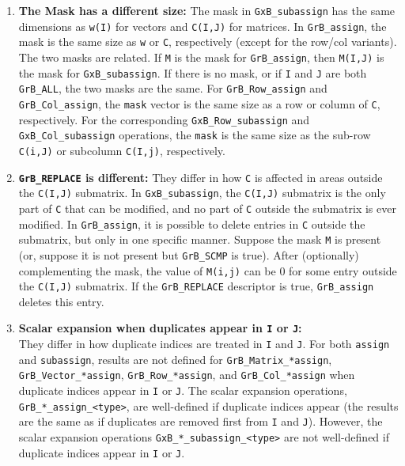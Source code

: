 \documentclass[12pt]{article}
\begin{document}
\begin{enumerate}
\item {\bf The Mask has a different size:}
    The mask in \verb'GxB_subassign' has the same dimensions as \verb'w(I)' for
    vectors and \verb'C(I,J)' for matrices.  In \verb'GrB_assign', the mask is
    the same size as \verb'w' or \verb'C', respectively (except for the row/col
    variants).  The two masks are related.  If \verb'M' is the mask for
    \verb'GrB_assign', then \verb'M(I,J)' is the mask for \verb'GxB_subassign'.
    If there is no mask, or if \verb'I' and \verb'J' are both \verb'GrB_ALL',
    the two masks are the same.
    For \verb'GrB_Row_assign' and \verb'GrB_Col_assign', the \verb'mask' vector
    is the same size as a row or column of \verb'C', respectively.  For the
    corresponding \verb'GxB_Row_subassign' and \verb'GxB_Col_subassign'
    operations, the \verb'mask' is the same size as the sub-row \verb'C(i,J)' or
    subcolumn \verb'C(I,j)', respectively.

\item {\bf \verb'GrB_REPLACE' is different:}
    They differ in how \verb'C' is affected in areas outside the \verb'C(I,J)'
    submatrix.  In \verb'GxB_subassign', the \verb'C(I,J)' submatrix is the
    only part of \verb'C' that can be modified, and no part of \verb'C' outside
    the submatrix is ever modified.  In \verb'GrB_assign', it is possible to
    delete entries in \verb'C' outside the submatrix, but only in one specific
    manner.  Suppose the mask \verb'M' is present (or, suppose it is not
    present but \verb'GrB_SCMP' is true).  After (optionally) complementing the
    mask, the value of \verb'M(i,j)' can be 0 for some entry outside the
    \verb'C(I,J)' submatrix.  If the \verb'GrB_REPLACE' descriptor is
    true, \verb'GrB_assign' deletes this entry.

\item {\bf Scalar expansion when duplicates appear in \verb'I' or \verb'J':} \\
    They differ in how duplicate indices are treated in \verb'I' and \verb'J'.
    For both \verb'assign' and \verb'subassign', results are not defined for
    \verb'GrB_Matrix_*assign', \verb'GrB_Vector_*assign',
    \verb'GrB_Row_*assign', and \verb'GrB_Col_*assign' when duplicate indices
    appear in \verb'I' or \verb'J'.  The scalar expansion operations,
    \verb'GrB_*_assign_<type>', are well-defined if duplicate indices appear
    (the results are the same as if duplicates are removed first from \verb'I'
    and \verb'J').  However, the scalar expansion operations
    \verb'GxB_*_subassign_<type>' are not well-defined if duplicate indices
    appear in \verb'I' or \verb'J'.

\end{enumerate}
\end{document}
